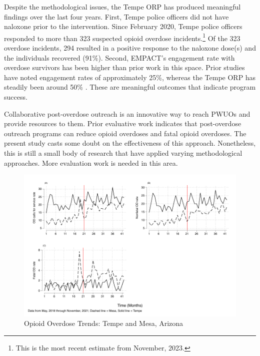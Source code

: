 Despite the methodological issues, the Tempe ORP has produced meaningful findings over the last four years. First, Tempe police officers did not have naloxone prior to the intervention. Since February 2020, Tempe police officers responded to more than 323 suspected opioid overdose incidents.\footnote{This is the most recent estimate from November, 2023.} Of the 323 overdose incidents, 294 resulted in a positive response to the naloxone dose(s) and the individuals recovered (91\%). Second, EMPACT's engagement rate with overdose survivors has been higher than prior work in this space. Prior studies have noted engagement rates of approximately 25\%, whereas the Tempe ORP has steadily been around 50\% \parencite{dahlem_beyond_2017, wagner_training_2016, watts_tempe_2023, white_moving_2021}. These are meaningful outcomes that indicate program success. 

Collaborative post-overdose outreach is an innovative way to reach PWUOs and provide resources to them. Prior evaluative work indicates that post-overdose outreach programs can reduce opioid overdoses and fatal opioid overdoses. The present study casts some doubt on the effectiveness of this approach. Nonetheless, this is still a small body of research that have applied varying methodological approaches. More evaluation work is needed in this area. 

\pagebreak



\begin{figure}
    \caption{\centering Opioid Overdose Trends: Tempe and Mesa, Arizona}
    \includegraphics{figures/rates_combined.pdf}
\end{figure}


